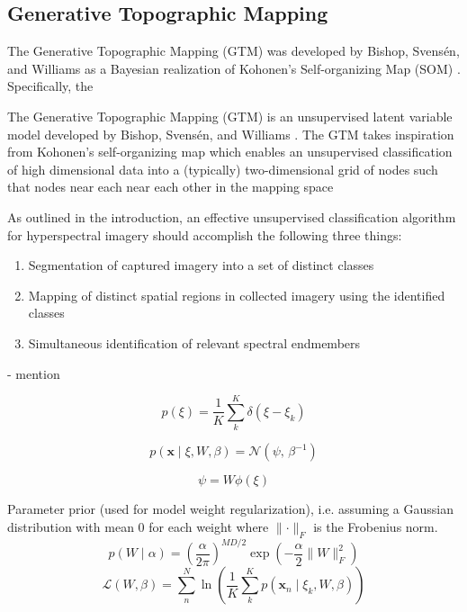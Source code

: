 \documentclass[remotesensing,article,submit,pdftex,moreauthors]{Definitions/mdpi}
\begin{document}
\subsection{Generative Topographic Mapping}


The Generative Topographic Mapping (GTM) was developed by Bishop, Svens\'en, and Williams as a Bayesian realization of Kohonen's Self-organizing Map (SOM) \cite{gtm-bishop-1}. Specifically, the 

The Generative Topographic Mapping (GTM) is an unsupervised latent variable model developed by Bishop, Svens\'en, and Williams \cite{gtm-bishop-1}. The GTM takes inspiration from Kohonen's self-organizing map which enables an unsupervised classification of high dimensional data into a (typically) two-dimensional grid of nodes such that nodes near each near each other in the mapping space



As outlined in the introduction, an effective unsupervised classification algorithm for hyperspectral imagery should accomplish the following three things: 
\begin{enumerate}
    \item Segmentation of captured imagery into a set of distinct classes
    \item Mapping of distinct spatial regions in collected imagery using the identified classes
    \item Simultaneous identification of relevant spectral endmembers
\end{enumerate}


- mention 

\begin{equation}\label{eq:latent-prob}
    p(\xi) = \frac{1}{K}\sum_k^K \delta(\xi - \xi_k)
\end{equation}

\begin{equation}\label{eq:data-prob}
    p\left( \mathbf{x} \mid \xi, W, \beta \right)  = \mathcal{N}(\psi,\, \beta^{-1})
\end{equation}

\begin{equation}\label{eq:psi}
    \psi = W\phi(\xi)
\end{equation}

Parameter prior (used for model weight regularization), i.e. assuming a Gaussian distribution with mean 0 for each weight where $\lVert \cdot \rVert_{F}$ is the Frobenius norm.
\begin{equation}\label{eq:weight-prior}
    p(W \mid \alpha) =  \left( \frac{\alpha}{2\pi} \right)^{MD/2}\exp\left(-\frac{\alpha}{2}\lVert W \rVert_{F}^2\right)
\end{equation}
\begin{equation}\label{eq:llh}
    \mathcal{L}(W, \beta) = \sum_n^N \ln \left(\dfrac{1}{K}\sum_k^K p(\mathbf{x}_n \mid \xi_k, W, \beta) \right)
\end{equation}
\end{document}
